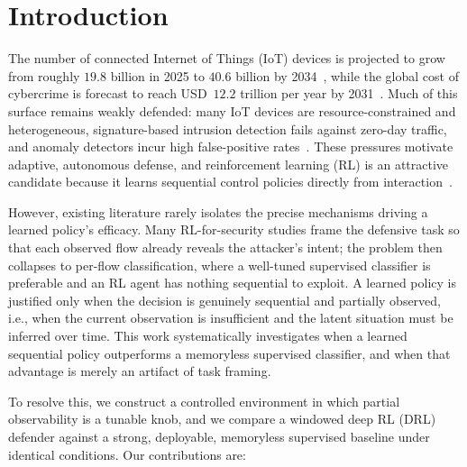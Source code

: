 \documentclass[3p,twocolumn]{elsarticle}
\begin{document}
\section{Introduction}
\label{sec:intro}

The number of connected Internet of Things (IoT) devices is projected to grow
from roughly $19.8$ billion in 2025 to $40.6$ billion by 2034~\cite{Statista2025},
while the global cost of cybercrime is forecast to reach USD~$12.2$ trillion per
year by 2031~\cite{Morgan2025}. Much of this surface remains weakly defended: many IoT
devices are resource-constrained and heterogeneous, signature-based intrusion
detection fails against zero-day traffic, and anomaly detectors incur high
false-positive rates~\cite{Khraisat2019}. These
pressures motivate adaptive, autonomous defense, and reinforcement learning (RL)
is an attractive candidate because it learns sequential control policies
directly from interaction~\cite{Chen2021,Sutton2018,Mnih2015,Schulman2017}.

However, existing literature rarely isolates the precise mechanisms driving a
learned policy's efficacy. Many RL-for-security studies frame the defensive
task so that each observed flow already reveals the attacker's intent; the
problem then collapses to per-flow classification, where a well-tuned
supervised classifier is preferable and an RL agent has nothing sequential to
exploit. A learned policy is justified only when the decision is genuinely
sequential and partially observed, i.e., when the current observation is
insufficient and the latent situation must be inferred over time. This work
systematically investigates when a learned sequential policy outperforms a
memoryless supervised classifier, and when that advantage is merely an artifact
of task framing.

To resolve this, we construct a controlled environment in which partial
observability is a tunable knob, and we compare a windowed deep RL (DRL)
defender against a strong, deployable, memoryless supervised baseline under
identical conditions. Our contributions are:
\end{document}
